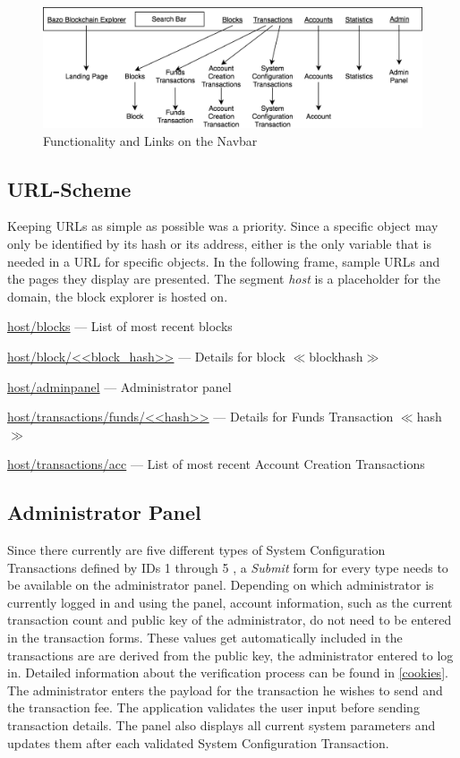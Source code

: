\begin{figure}
  \includegraphics[scale=0.35]{navbarmockup.png}
  \centering
  \caption{Functionality and Links on the Navbar}
  \label{fig:navbar}
\end{figure}

\subsection{URL-Scheme}
Keeping URLs as simple as possible was a priority. Since a specific object may only be identified by its hash or its address, either is the only variable that is needed in a URL for specific objects. In the following frame, sample URLs and the pages they display are presented. The segment \emph{host} is a placeholder for the domain, the block explorer is hosted on.

\begin{framed}
\url{host/blocks} --- List of most recent blocks

\url{host/block/<<block_hash>>} --- Details for block $\ll$blockhash$\gg$

\url{host/adminpanel} --- Administrator panel

\url{host/transactions/funds/<<hash>>} --- Details for Funds Transaction $\ll$hash$\gg$

\url{host/transactions/acc} --- List of most recent Account Creation Transactions
\end{framed}

\subsection{Administrator Panel}
Since there currently are five different types of System Configuration Transactions defined by IDs 1 through 5 \cite{bazo}, a \emph{Submit} form for every type needs to be available on the administrator panel. Depending on which administrator is currently logged in and using the panel, account information, such as the current transaction count and public key of the administrator, do not need to be entered in the transaction forms. These values get automatically included in the transactions are are derived from the public key, the administrator entered to log in. Detailed information about the verification process can be found in \ref{cookies}. The administrator enters the payload for the transaction he wishes to send and the transaction fee. The application validates the user input before sending transaction details. The panel also displays all current system parameters and updates them after each validated System Configuration Transaction. 

